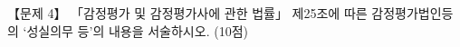 \begin{longquestion}{【문제 4】}
「감정평가 및 감정평가사에 관한 법률」 제25조에 따른 감정평가법인등의 ‘성실의무 등’의 내용을 서술하시오. (10점) \par
\end{longquestion}
